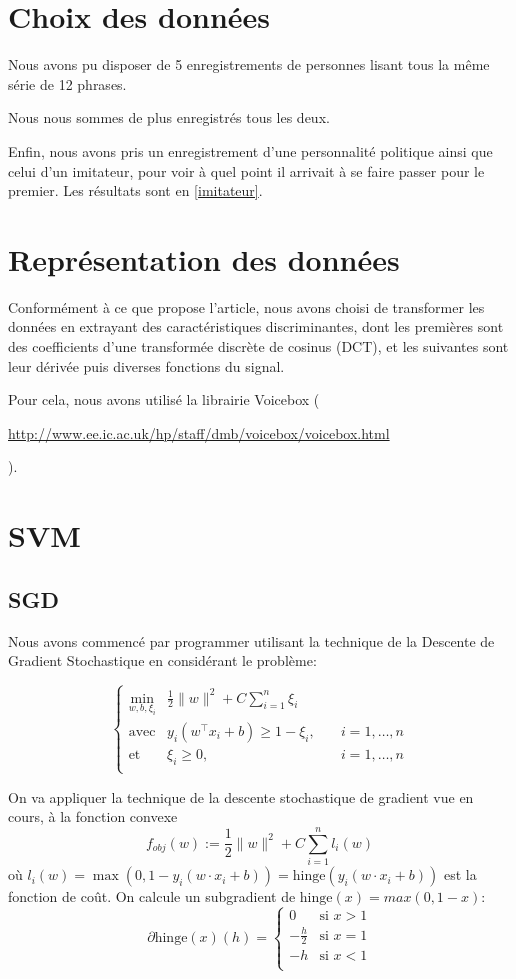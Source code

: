 \documentclass{article}
\let\urlorig\url
\renewcommand{\url}[1]{%
  \begin{otherlanguage}{english}\urlorig{#1}\end{otherlanguage}%
}
\begin{document}
\section{Choix des données}
Nous avons pu disposer de 5 enregistrements de personnes lisant tous la même série de 12 phrases.

Nous nous sommes de plus enregistrés tous les deux.

Enfin, nous avons pris un enregistrement d'une personnalité politique ainsi que celui d'un imitateur, pour voir à quel point il arrivait à se faire passer pour le premier. Les résultats sont en \ref{imitateur}.
\section{Représentation des données}
\label{representation}
Conformément à ce que propose l'article, nous avons choisi de transformer les données en extrayant des caractéristiques discriminantes, dont les premières sont des coefficients d'une transformée discrète de cosinus (DCT), et les suivantes sont leur dérivée puis diverses fonctions du signal.

Pour cela, nous avons utilisé la librairie Voicebox (\url{http://www.ee.ic.ac.uk/hp/staff/dmb/voicebox/voicebox.html}).
\section{SVM}
\label{svm}
\subsection{SGD}
\label{sgd}
Nous avons commencé par programmer utilisant la technique de la Descente de Gradient Stochastique en considérant le problème:

\begin{equation}
\label{eq:primalSVM}
  \left\{
    \begin{array} {lll}
      \displaystyle\min_{w,b,\xi_i} & \frac{1}{2} \|w\|^2 + C\displaystyle\sum\limits_{i=1}^{n}\xi_i&\\
      \mbox{avec} &y_i(w^\top  x_i+b) \geq 1 - \xi_i,\quad & i=1,\dots ,n  \\
      \mbox{et} &\xi_i \geq 0 , &i=1,\dots ,n  \\
    \end{array}
  \right.
\end{equation}

On va appliquer la technique de la descente stochastique de gradient vue en cours, à la fonction convexe
\[ f_{obj}(w) := \frac{1}{2} \|w\|^2 + C\displaystyle\sum\limits_{i=1}^{n}l_i(w) \]
où $l_i(w) = \max (0, 1 - y_i (w \cdot x_i + b)) = \mathrm{hinge}(y_i (w \cdot x_i + b))$ est la fonction de coût.
On calcule un subgradient de $\mathrm{hinge}(x) = max(0,1-x)$:
\[ \partial \mathrm{hinge}(x)(h) = \begin{cases} 0 &\mbox{si } x>1 \\
-\frac{h}{2} & \mbox{si } x=1\\
-h & \mbox{si } x<1\\
 \end{cases}\]
 
\end{document}
